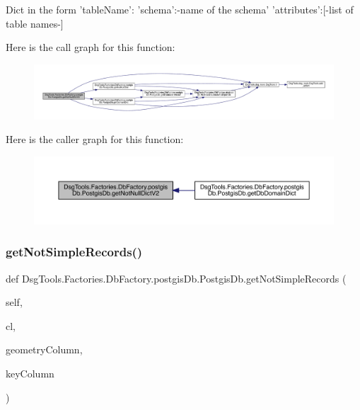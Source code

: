 \begin{DoxyVerb}Dict in the form 'tableName': { 'schema':-name of the schema'
                        'attributes':[-list of table names-]}
\end{DoxyVerb}
 Here is the call graph for this function\+:
\nopagebreak
\begin{figure}[H]
\begin{center}
\leavevmode
\includegraphics[width=350pt]{class_dsg_tools_1_1_factories_1_1_db_factory_1_1postgis_db_1_1_postgis_db_aea8a82ce913538818084cc59189c6a1a_cgraph}
\end{center}
\end{figure}
Here is the caller graph for this function\+:
\nopagebreak
\begin{figure}[H]
\begin{center}
\leavevmode
\includegraphics[width=350pt]{class_dsg_tools_1_1_factories_1_1_db_factory_1_1postgis_db_1_1_postgis_db_aea8a82ce913538818084cc59189c6a1a_icgraph}
\end{center}
\end{figure}
\mbox{\label{class_dsg_tools_1_1_factories_1_1_db_factory_1_1postgis_db_1_1_postgis_db_a4ace28697a1080a7f1375914f83c24f6}} 
\subsubsection{\texorpdfstring{get\+Not\+Simple\+Records()}{getNotSimpleRecords()}}
{\footnotesize\ttfamily def Dsg\+Tools.\+Factories.\+Db\+Factory.\+postgis\+Db.\+Postgis\+Db.\+get\+Not\+Simple\+Records (\begin{DoxyParamCaption}\item[{}]{self,  }\item[{}]{cl,  }\item[{}]{geometry\+Column,  }\item[{}]{key\+Column }\end{DoxyParamCaption})}

